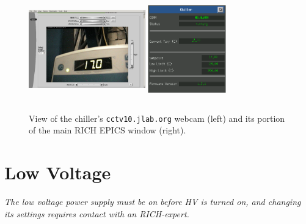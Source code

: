 \documentclass[12pt]{article}
\begin{document}
\begin{figure}[htbp]
\center
\includegraphics[width=0.45\textwidth,height=4.5cm]{pics/ChillerCam_2014_12_20.png}
\includegraphics[width=0.3\textwidth,height=4.5cm]{pics/epics_ecal_chiller.png}
\caption{ \label{ChillerCam} View of the chiller's \texttt{cctv10.jlab.org} webcam (left) and its portion of the main RICH EPICS window (right).}
\end{figure}

\newpage
{\color{blue}

\section{Low Voltage}
}
{\em The low voltage power supply must be on before HV is turned on, and changing its settings requires contact with an RICH-expert.}
      
\end{document}
